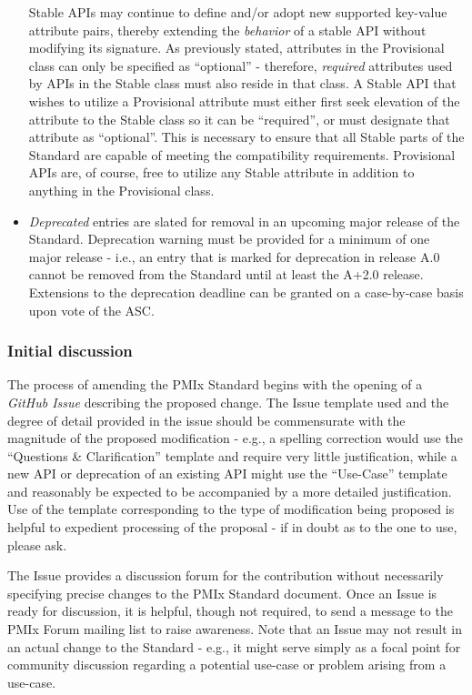 \documentclass{article}
\begin{document}
\begin{itemize}
  Stable APIs may continue to define and/or adopt new supported
  key-value attribute pairs, thereby extending the \emph{behavior} of a
  stable API without modifying its signature. As previously stated,
  attributes in the Provisional class can only be specified as
  ``optional'' - therefore, \emph{required} attributes used by APIs in
  the Stable class must also reside in that class. A Stable API
  that wishes to utilize a Provisional attribute must either first
  seek elevation of the attribute to the Stable class so it can be
  ``required'', or must designate that attribute as ``optional''. This
  is necessary to ensure that all Stable parts of the Standard are
  capable of meeting the compatibility requirements. Provisional
  APIs are, of course, free to utilize any Stable attribute in
  addition to anything in the Provisional class.
\item
  \textit{Deprecated} entries are slated for removal in an upcoming
  major release of the Standard. Deprecation warning must be provided
  for a minimum of one major release - i.e., an entry that is marked for
  deprecation in release A.0 cannot be removed from the Standard until
  at least the A+2.0 release. Extensions to the deprecation deadline can
  be granted on a case-by-case basis upon vote of the ASC.
\end{itemize}

\hypertarget{initial-discussion}{%
\subsubsection{Initial discussion}\label{initial-discussion}}

The process of amending the PMIx Standard begins with the opening of a
\textit{GitHub Issue} describing the proposed change. The Issue template
used and the degree of detail provided in the issue should be
commensurate with the magnitude of the proposed modification - e.g., a
spelling correction would use the ``Questions \& Clarification''
template and require very little justification, while a new API or
deprecation of an existing API might use the ``Use-Case'' template and
reasonably be expected to be accompanied by a more detailed
justification. Use of the template corresponding to the type of
modification being proposed is helpful to expedient processing of the
proposal - if in doubt as to the one to use, please ask.

The Issue provides a discussion forum for the contribution without
necessarily specifying precise changes to the PMIx Standard document.
Once an Issue is ready for discussion, it is helpful, though not
required, to send a message to the PMIx Forum mailing list to raise
awareness. Note that an Issue may not result in an actual change to the
Standard - e.g., it might serve simply as a focal point for community
discussion regarding a potential use-case or problem arising from a
use-case.
\end{document}
